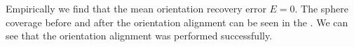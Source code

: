 Empirically we find that the mean orientation recovery error  $E = 0$. The sphere coverage before and after the orientation alignment can be seen in the . We can see that the orientation alignment was performed successfully.


